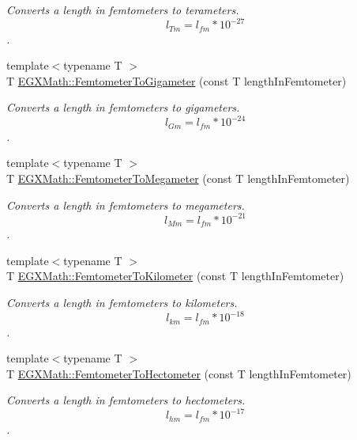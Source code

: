 \begin{DoxyCompactItemize}
\begin{DoxyCompactList}\small\item\em Converts a length in femtometers to terameters. \[ l_{Tm}=l_{fm} * 10^{-27} \]. \end{DoxyCompactList}\item 
{\footnotesize template$<$typename T $>$ }\\T \mbox{\hyperlink{group___e_g_x_math-_conversions-_length_conversions-_s_i-_femtometer-_s_i_gaccd849112d6d7fed98d4c4d737ec8872}{E\+G\+X\+Math\+::\+Femtometer\+To\+Gigameter}} (const T length\+In\+Femtometer)
\begin{DoxyCompactList}\small\item\em Converts a length in femtometers to gigameters. \[ l_{Gm}=l_{fm} * 10^{-24} \]. \end{DoxyCompactList}\item 
{\footnotesize template$<$typename T $>$ }\\T \mbox{\hyperlink{group___e_g_x_math-_conversions-_length_conversions-_s_i-_femtometer-_s_i_gac6c32f00b8dbf147521bdcfeb39b57f2}{E\+G\+X\+Math\+::\+Femtometer\+To\+Megameter}} (const T length\+In\+Femtometer)
\begin{DoxyCompactList}\small\item\em Converts a length in femtometers to megameters. \[ l_{Mm}=l_{fm} * 10^{-21} \]. \end{DoxyCompactList}\item 
{\footnotesize template$<$typename T $>$ }\\T \mbox{\hyperlink{group___e_g_x_math-_conversions-_length_conversions-_s_i-_femtometer-_s_i_ga539d33a130ba1069fe9dfaea944cd4ed}{E\+G\+X\+Math\+::\+Femtometer\+To\+Kilometer}} (const T length\+In\+Femtometer)
\begin{DoxyCompactList}\small\item\em Converts a length in femtometers to kilometers. \[ l_{km}=l_{fm} * 10^{-18} \]. \end{DoxyCompactList}\item 
{\footnotesize template$<$typename T $>$ }\\T \mbox{\hyperlink{group___e_g_x_math-_conversions-_length_conversions-_s_i-_femtometer-_s_i_gae889d6c7cbcb59336da14db49d503935}{E\+G\+X\+Math\+::\+Femtometer\+To\+Hectometer}} (const T length\+In\+Femtometer)
\begin{DoxyCompactList}\small\item\em Converts a length in femtometers to hectometers. \[ l_{hm}=l_{fm} * 10^{-17} \]. \end{DoxyCompactList}\item 

\end{DoxyCompactItemize}
